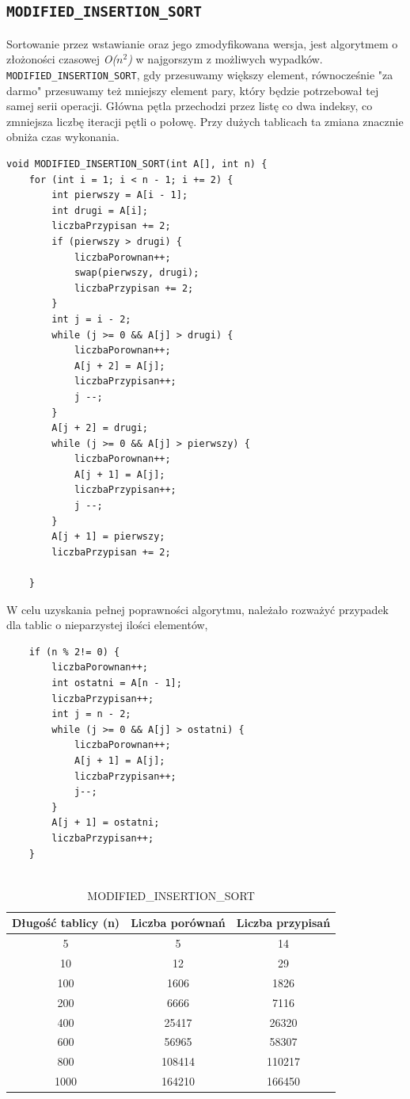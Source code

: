 \documentclass{article}
\begin{document}
\subsection{\texttt{MODIFIED\_INSERTION\_SORT}}
Sortowanie przez wstawianie oraz jego zmodyfikowana wersja, jest algorytmem o złożoności czasowej \emph{O($n^2$)} w najgorszym z możliwych wypadków. 
\\ \texttt{MODIFIED\_INSERTION\_SORT}, gdy przesuwamy większy element, równocześnie "za darmo" przesuwamy też mniejszy element pary, który będzie potrzebował tej samej serii operacji. Główna pętla przechodzi przez listę co dwa indeksy, co zmniejsza liczbę iteracji pętli o połowę. Przy dużych tablicach ta zmiana znacznie obniża czas wykonania.
\begin{lstlisting}
void MODIFIED_INSERTION_SORT(int A[], int n) {
	for (int i = 1; i < n - 1; i += 2) {
		int pierwszy = A[i - 1];
		int drugi = A[i];
		liczbaPrzypisan += 2;
		if (pierwszy > drugi) {
			liczbaPorownan++;
			swap(pierwszy, drugi);
			liczbaPrzypisan += 2;
		}
		int j = i - 2;
		while (j >= 0 && A[j] > drugi) {
			liczbaPorownan++;
			A[j + 2] = A[j];
			liczbaPrzypisan++;
			j --;
		}
		A[j + 2] = drugi;
		while (j >= 0 && A[j] > pierwszy) {
			liczbaPorownan++;
			A[j + 1] = A[j];
			liczbaPrzypisan++;
			j --;
		}
		A[j + 1] = pierwszy;
		liczbaPrzypisan += 2;
		
	}
\end{lstlisting}
W celu uzyskania pełnej poprawności algorytmu, należało rozważyć przypadek dla tablic o nieparzystej ilości elementów,
\begin{lstlisting}
	if (n % 2!= 0) {
		liczbaPorownan++;
		int ostatni = A[n - 1];
		liczbaPrzypisan++;
		int j = n - 2;
		while (j >= 0 && A[j] > ostatni) {
			liczbaPorownan++;
			A[j + 1] = A[j];
			liczbaPrzypisan++;
			j--;
		}
		A[j + 1] = ostatni;
		liczbaPrzypisan++;
	}


\end{lstlisting}
\begin{table}[h!]
	\centering
	\small 
	\begin{tabular}{|c|c|c|}
		\hline
		\textbf{Długość tablicy (n)} & \textbf{Liczba porównań} & \textbf{Liczba przypisań} \\ \hline
		5   & 5     & 14     \\ \hline
		10  & 12   &   29   \\ \hline
		100 & 1606  & 1826   \\ \hline
		200 & 6666 & 7116  \\ \hline
		400 & 25417 & 26320  \\ \hline
		600 & 56965 & 58307  \\ \hline
		800 & 108414 & 110217 \\ \hline
		1000 & 164210 & 166450 \\ \hline
	\end{tabular}
	\caption{MODIFIED\_INSERTION\_SORT}
\end{table}
\end{document}
